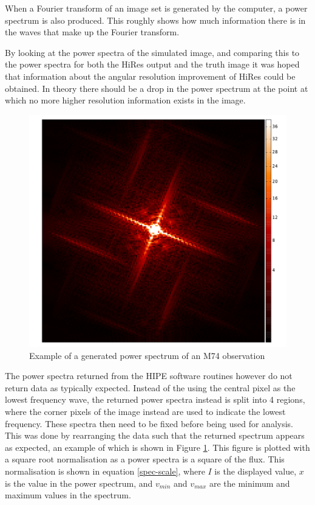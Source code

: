 When a Fourier transform of an image set is generated by the computer, a power spectrum is also produced. This roughly shows how much information there is in the waves that make up the Fourier transform.

By looking at the power spectra of the simulated image, and comparing this to the power spectra for both the HiRes output and the truth image it was hoped that information about the angular resolution improvement of HiRes could be obtained. In theory there should be a drop in the power spectrum at the point at which no more higher resolution information exists in the image.

\begin{figure}[H]
    \centering
    \includegraphics[width=0.8\linewidth]{figures/power-spec-sample.pdf}
    \caption[Example Power Spectrum]{Example of a generated power spectrum of an M74 observation}
    \label{spec-sample}
\end{figure}

The power spectra returned from the HIPE software routines however do not return data as typically expected. Instead of the using the central pixel as the lowest frequency wave, the returned power spectra instead is split into 4 regions, where the corner pixels of the image instead are used to indicate the lowest frequency. These spectra then need to be fixed before being used for analysis. This was done by rearranging the data such that the returned spectrum appears as expected, an example of which is shown in Figure \ref{spec-sample}. This figure is plotted with a square root normalisation as a power spectra is a square of the flux. This normalisation is shown in equation \ref{spec-scale}, where $I$ is the displayed value, $x$ is the value in the power spectrum, and $v_{min}$ and $v_{max}$ are the minimum and maximum values in the spectrum.

